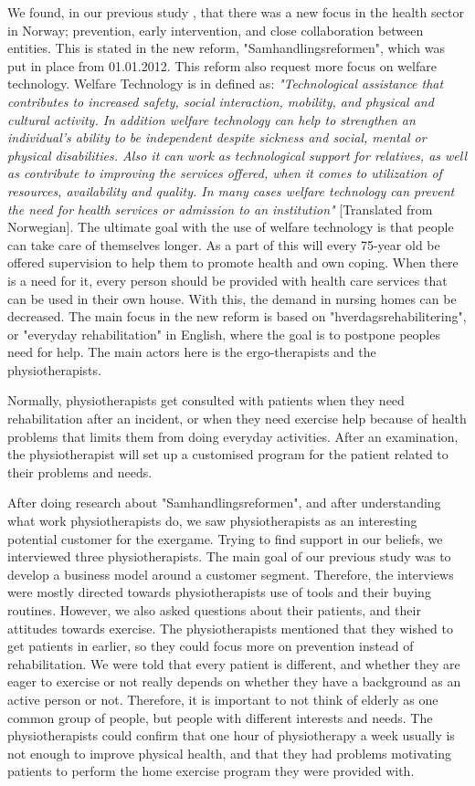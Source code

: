 We found, in our previous study \cite{project}, that there was a new focus in the health sector in Norway; prevention, early intervention, and close collaboration between entities. This is stated in the new reform, "Samhandlingsreformen", which was put in place from 01.01.2012. This reform also request more focus on welfare technology. Welfare Technology is in \cite{welfare} defined as: \emph{"Technological assistance that contributes to increased safety, social interaction, mobility, and physical and cultural activity. In addition welfare technology can help to strengthen an individual's ability to be independent despite sickness and social, mental or physical disabilities. Also it can work as technological support for relatives, as well as contribute to improving the services offered, when it comes to utilization of resources, availability and quality. In many cases welfare technology can prevent the need for health services or admission to an institution"} [Translated from Norwegian]. The ultimate goal with the use of welfare technology is that people can take care of themselves longer.  As a part of this will every 75-year old be offered supervision to help them to promote health and own coping. When there is a need for it, every person should be provided with health care services that can be used in their own house. With this, the demand in nursing homes can be decreased. The main focus in the new reform is based on "hverdagsrehabilitering", or "everyday rehabilitation" in English, where the goal is to postpone peoples need for help. The main actors here is the ergo-therapists and the physiotherapists.

Normally, physiotherapists get consulted with patients when they need rehabilitation after an incident, or when they need exercise help because of health problems that limits them from doing everyday activities. After an examination, the physiotherapist will set up a customised program for the patient related to their problems and needs.

After doing research about "Samhandlingsreformen", and after understanding what work physiotherapists do, we saw physiotherapists as an interesting potential customer for the exergame. Trying to find support in our beliefs, we interviewed three physiotherapists. The main goal of our previous study was to develop a business model around a customer segment. Therefore, the interviews were mostly directed towards physiotherapists use of tools and their buying routines. However, we also asked questions about their patients, and their attitudes towards exercise. The physiotherapists mentioned that they wished to get patients in earlier, so they could focus more on prevention instead of rehabilitation. We were told that every patient is different, and whether they are eager to exercise or not really depends on whether they have a background as an active person or not. Therefore, it is important to not think of elderly as one common group of people, but people with different interests and needs. The physiotherapists could confirm that one hour of physiotherapy a week usually is not enough to improve physical health, and that they had problems motivating patients to perform the home exercise program they were provided with. 

